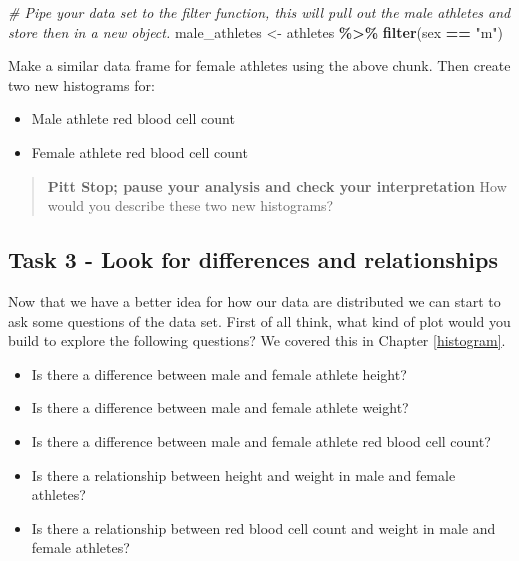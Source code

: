 \documentclass[
]{book}
\newenvironment{Shaded}{\begin{snugshade}}{\end{snugshade}}
\newcommand{\CommentTok}[1]{\textcolor[rgb]{0.56,0.35,0.01}{\textit{#1}}}
\newcommand{\FunctionTok}[1]{\textcolor[rgb]{0.13,0.29,0.53}{\textbf{#1}}}
\newcommand{\NormalTok}[1]{#1}
\newcommand{\OtherTok}[1]{\textcolor[rgb]{0.56,0.35,0.01}{#1}}
\newcommand{\SpecialCharTok}[1]{\textcolor[rgb]{0.81,0.36,0.00}{\textbf{#1}}}
\newcommand{\StringTok}[1]{\textcolor[rgb]{0.31,0.60,0.02}{#1}}
\providecommand{\tightlist}{%
  \setlength{\itemsep}{0pt}\setlength{\parskip}{0pt}}
\begin{document}
\begin{Shaded}
\begin{Highlighting}[]
\CommentTok{\# Pipe your data set to the filter function, this will pull out the male athletes and store then in a new object.}
\NormalTok{male\_athletes }\OtherTok{\textless{}{-}}\NormalTok{ athletes }\SpecialCharTok{\%\textgreater{}\%}
  \FunctionTok{filter}\NormalTok{(sex }\SpecialCharTok{==} \StringTok{"m"}\NormalTok{)}
\end{Highlighting}
\end{Shaded}

Make a similar data frame for female athletes using the above chunk. Then create two new histograms for:

\begin{itemize}
\tightlist
\item
  Male athlete red blood cell count
\item
  Female athlete red blood cell count
\end{itemize}

\begin{quote}
\textbf{Pitt Stop; pause your analysis and check your interpretation}
How would you describe these two new histograms?
\end{quote}

\subsection{Task 3 - Look for differences and relationships}\label{task-3---look-for-differences-and-relationships}

Now that we have a better idea for how our data are distributed we can start to ask some questions of the data set. First of all think, what kind of plot would you build to explore the following questions? We covered this in Chapter \ref{histogram}.

\begin{itemize}
\tightlist
\item
  Is there a difference between male and female athlete height?
\item
  Is there a difference between male and female athlete weight?
\item
  Is there a difference between male and female athlete red blood cell count?
\item
  Is there a relationship between height and weight in male and female athletes?
\item
  Is there a relationship between red blood cell count and weight in male and female athletes?
\end{itemize}
\end{document}
